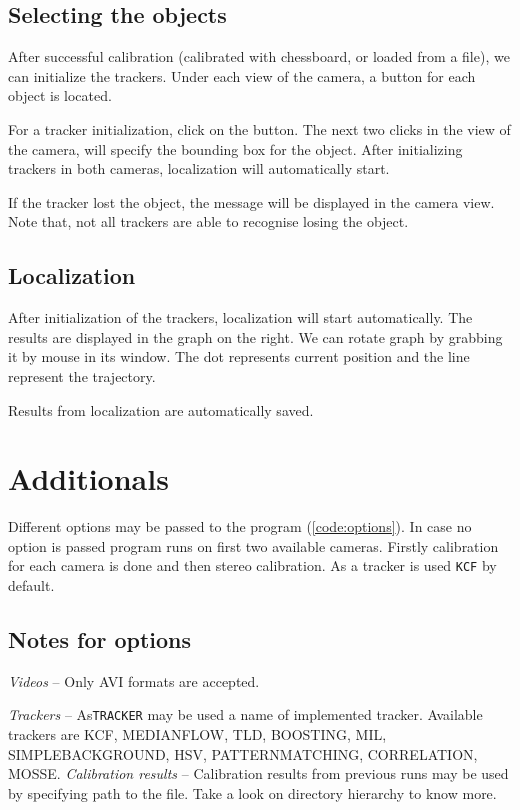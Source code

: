 \subsection{Selecting the objects}
After successful calibration (calibrated with chessboard, or loaded from a
file), we can initialize the trackers. Under each view of the camera, a button
for each object is located.

For a tracker initialization, click on the button. The next two clicks in the
view of the camera, will specify the bounding box for the object. After
initializing trackers in both cameras, localization will automatically start.

If the tracker lost the object, the message will be displayed in the camera
view. Note that, not all trackers are able to recognise losing the object.

\subsection{Localization}
After initialization of the trackers, localization will start automatically.
The results are displayed in the graph on the right. We can rotate graph by
grabbing it by mouse in its window. The dot represents current position and the
line represent the trajectory.

Results from localization are automatically saved.

\section{Additionals}

Different options may be passed to the program (\ref{code:options}). In case no option
is passed program runs on first two available cameras. Firstly calibration for
each camera is done and then stereo calibration. As a tracker is used \verb+KCF+ by default.

\begin{figure}
\lstset{basicstyle=\ttfamily\footnotesize,breaklines=true,frame=lrtb}

\end{figure}

\subsection{Notes for options}
\emph{Videos} -- Only AVI formats are accepted.

\emph{Trackers} -- As\verb+TRACKER+ may be used a name of implemented tracker. Available trackers
are KCF, MEDIANFLOW, TLD, BOOSTING, MIL, SIMPLEBACKGROUND, HSV,
PATTERNMATCHING, CORRELATION, MOSSE.
\emph{Calibration results} -- Calibration results from previous runs may be
used by specifying path to the file. Take a look on directory hierarchy to know
more.

